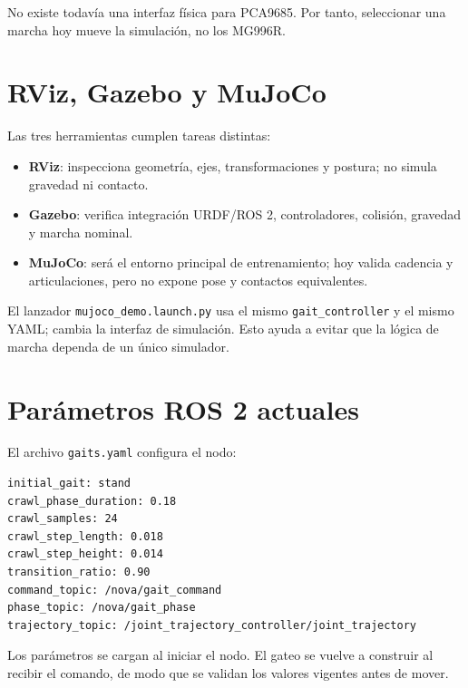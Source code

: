 \documentclass[11pt,a4paper]{article}
\begin{document}
No existe todavía una interfaz física para PCA9685. Por tanto, seleccionar una
marcha hoy mueve la simulación, no los MG996R.

\section{RViz, Gazebo y MuJoCo}
Las tres herramientas cumplen tareas distintas:
\begin{itemize}
\item \textbf{RViz}: inspecciona geometría, ejes, transformaciones y postura;
  no simula gravedad ni contacto.
\item \textbf{Gazebo}: verifica integración URDF/ROS 2, controladores, colisión,
  gravedad y marcha nominal.
\item \textbf{MuJoCo}: será el entorno principal de entrenamiento; hoy valida
  cadencia y articulaciones, pero no expone pose y contactos equivalentes.
\end{itemize}

El lanzador \texttt{mujoco\_demo.launch.py} usa el mismo
\texttt{gait\_controller} y el mismo YAML; cambia la interfaz de simulación.
Esto ayuda a evitar que la lógica de marcha dependa de un único simulador.

\section{Parámetros ROS 2 actuales}
El archivo \texttt{gaits.yaml} configura el nodo:
\begin{lstlisting}[style=terminal]
initial_gait: stand
crawl_phase_duration: 0.18
crawl_samples: 24
crawl_step_length: 0.018
crawl_step_height: 0.014
transition_ratio: 0.90
command_topic: /nova/gait_command
phase_topic: /nova/gait_phase
trajectory_topic: /joint_trajectory_controller/joint_trajectory
\end{lstlisting}
Los parámetros se cargan al iniciar el nodo. El gateo se vuelve a construir al
recibir el comando, de modo que se validan los valores vigentes antes de mover.
\end{document}
